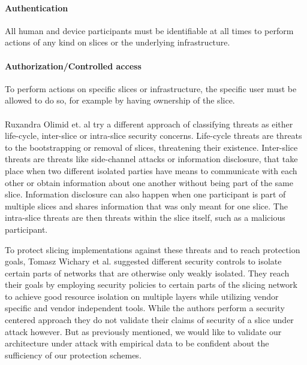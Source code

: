 \paragraph{Authentication} All human and device participants must be identifiable at all times to perform actions of any kind on slices or the underlying infrastructure.

\paragraph{Authorization/Controlled access} To perform actions on specific slices or infrastructure, the specific user must be allowed to do so, for example by having ownership of the slice.

\paragraph{}Ruxandra Olimid et. al \cite{SE2} try a different approach of classifying threats as either life-cycle, inter-slice or intra-slice security concerns. Life-cycle threats are threats to the bootstrapping or removal of slices, threatening their existence. Inter-slice threats are threats like side-channel attacks or information disclosure, that take place when two different isolated parties have means to communicate with each other or obtain information about one another without being part of the same slice. Information disclosure can also happen when one participant is part of multiple slices and shares information that was only meant for one slice. The intra-slice threats are then threats within the slice itself, such as a malicious participant.

To protect slicing implementations against these threats and to reach protection goals, Tomasz Wichary et al. \cite{SE3} suggested different security controls to isolate certain parts of networks that are otherwise only weakly isolated. They reach their goals by employing security policies to certain parts of the slicing network to achieve good resource isolation on multiple layers while utilizing vendor specific and vendor independent tools. While the authors perform a security centered approach they do not validate their claims of security of a slice under attack however. But as previously mentioned, we would like to validate our architecture under attack with empirical data to be confident about the sufficiency of our protection schemes.

